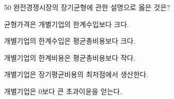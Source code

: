 \begin{question}{50}
완전경쟁시장의 장기균형에 관한 설명으로 옳은 것은?
\begin{choices}
  \item 균형가격은 개별기업의 한계수입보다 크다.
  \item 개별기업의 한계수입은 평균총비용보다 크다.
  \item 개별기업의 한계비용은 평균총비용보다 작다.
  \item 개별기업은 장기평균비용의 최저점에서 생산한다.
  \item 개별기업은 0보다 큰 초과이윤을 얻는다.
\end{choices}
\end{question}
